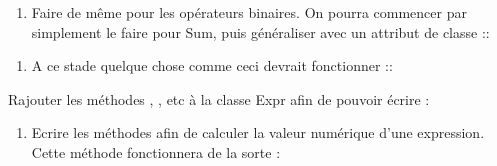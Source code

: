 \documentclass[letterpaper,10pt,english]{sphinxhowto}
\begin{document}
\begin{sphinxVerbatim}[commandchars=\\\{\}]
 
      
\end{sphinxVerbatim}
\begin{enumerate}
%
\setcounter{enumi}{4}
\item {} 
\sphinxAtStartPar
Faire de même pour les opérateurs binaires. On pourra commencer par simplement le faire pour Sum, puis généraliser avec un attribut de classe ::

\end{enumerate}

\begin{sphinxVerbatim}[commandchars=\\\{\}]
 
      
\end{sphinxVerbatim}
\begin{enumerate}
%
\setcounter{enumi}{5}
\item {} 
\sphinxAtStartPar
A ce stade quelque chose comme ceci devrait fonctionner ::

\end{enumerate}

\begin{sphinxVerbatim}[commandchars=\\\{\}]
  
  
  
\end{sphinxVerbatim}

\sphinxAtStartPar
Rajouter les méthodes , , etc à la classe Expr afin de pouvoir écrire :

\begin{sphinxVerbatim}[commandchars=\\\{\}]
  
\end{sphinxVerbatim}
\begin{enumerate}
%
\setcounter{enumi}{6}
\item {} 
\sphinxAtStartPar
Ecrire les méthodes  afin de calculer la valeur numérique d’une expression. Cette méthode fonctionnera de la sorte :

\end{enumerate}
\end{document}
